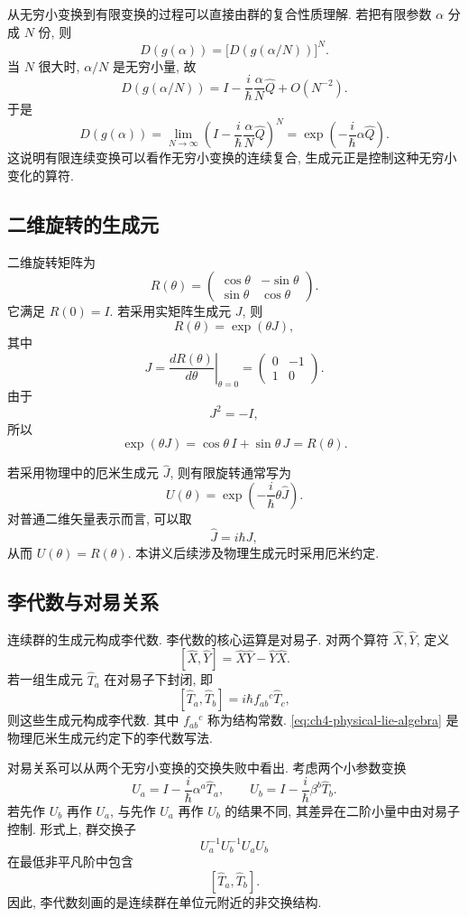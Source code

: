 从无穷小变换到有限变换的过程可以直接由群的复合性质理解. 若把有限参数 $\alpha$ 分成 $N$ 份, 则
\[
D(g(\alpha))=\bigl[D(g(\alpha/N))\bigr]^N.
\]
当 $N$ 很大时, $\alpha/N$ 是无穷小量, 故
\[
D(g(\alpha/N))
=
I-\frac{i}{\hbar}\frac{\alpha}{N}\hat{Q}+O(N^{-2}).
\]
于是
\[
D(g(\alpha))
=
\lim_{N\to\infty}
\left(
I-\frac{i}{\hbar}\frac{\alpha}{N}\hat{Q}
\right)^N
=
\exp\left(-\frac{i}{\hbar}\alpha\hat{Q}\right).
\]
这说明有限连续变换可以看作无穷小变换的连续复合, 生成元正是控制这种无穷小变化的算符. 

\subsection{二维旋转的生成元}

二维旋转矩阵为
\[
R(\theta)
=
\begin{pmatrix}
\cos\theta&-\sin\theta\\
\sin\theta&\cos\theta
\end{pmatrix}.
\]
它满足 $R(0)=I$. 若采用实矩阵生成元 $J$, 则
\[
R(\theta)=\exp(\theta J),
\]
其中
\[
J
=
\left.
\frac{dR(\theta)}{d\theta}
\right|_{\theta=0}
=
\begin{pmatrix}
0&-1\\
1&0
\end{pmatrix}.
\]
由于
\[
J^2=-I,
\]
所以
\[
\exp(\theta J)
=
\cos\theta\,I+\sin\theta\,J
=
R(\theta).
\]

若采用物理中的厄米生成元 $\hat{J}$, 则有限旋转通常写为
\[
U(\theta)
=
\exp\left(-\frac{i}{\hbar}\theta\hat{J}\right).
\]
对普通二维矢量表示而言, 可以取
\[
\hat{J}=i\hbar J,
\]
从而 $U(\theta)=R(\theta)$. 本讲义后续涉及物理生成元时采用厄米约定. 

\subsection{李代数与对易关系}

连续群的生成元构成李代数. 李代数的核心运算是对易子. 对两个算符 $\hat{X},\hat{Y}$, 定义
\[
[\hat{X},\hat{Y}]=\hat{X}\hat{Y}-\hat{Y}\hat{X}.
\]
若一组生成元 $\hat{T}_a$ 在对易子下封闭, 即
\begin{equation}
\label{eq:ch4-physical-lie-algebra}
[\hat{T}_a,\hat{T}_b]
=
i\hbar f_{ab}{}^c\hat{T}_c,
\end{equation}
则这些生成元构成李代数. 其中 $f_{ab}{}^c$ 称为结构常数. \eqref{eq:ch4-physical-lie-algebra} 是物理厄米生成元约定下的李代数写法. 

对易关系可以从两个无穷小变换的交换失败中看出. 考虑两个小参数变换
\[
U_a=I-\frac{i}{\hbar}\alpha^a\hat{T}_a,
\qquad
U_b=I-\frac{i}{\hbar}\beta^b\hat{T}_b.
\]
若先作 $U_b$ 再作 $U_a$, 与先作 $U_a$ 再作 $U_b$ 的结果不同, 其差异在二阶小量中由对易子控制. 形式上, 群交换子
\[
U_a^{-1}U_b^{-1}U_aU_b
\]
在最低非平凡阶中包含
\[
[\hat{T}_a,\hat{T}_b].
\]
因此, 李代数刻画的是连续群在单位元附近的非交换结构. 

